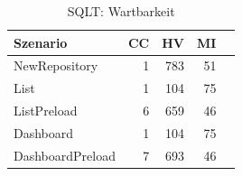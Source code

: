 \begin{table}[ht]
\centering
\caption{SQLT: Wartbarkeit}
\begin{tabular}{lrrrr}
\toprule
Szenario & CC & HV & MI \\
\midrule
	NewRepository & 1 & 783 & 51 \\
	List & 1 & 104 & 75 \\
	ListPreload & 6 & 659 & 46 \\
	Dashboard & 1 & 104 & 75 \\
	DashboardPreload & 7 & 693 & 46 \\
\bottomrule
\end{tabular}
\label{tab:sqlt_maintainability}
\end{table}
	